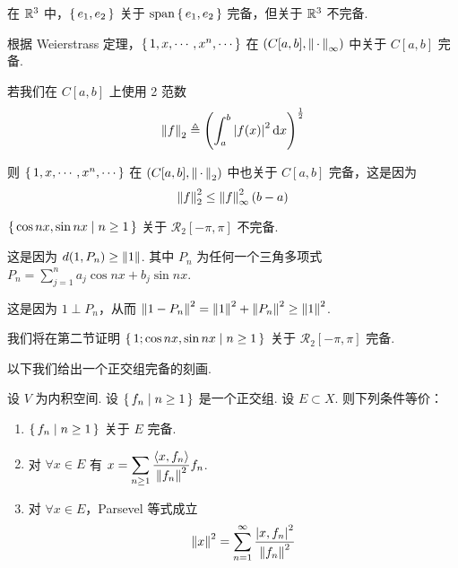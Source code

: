 \begin{example}
    在 $\mathbb{R}^3$ 中，$\set{e_1,e_2}$ 关于 $\mathrm{span}\set{e_1,e_2}$ 完备，但关于 $\mathbb{R}^3$ 不完备.
\end{example}

\begin{example}
    根据 Weierstrass 定理，$\set{1,x,\cdots,x^n,\cdots}$ 在 $(C[a,b],\left\lVert{\,\cdot\,}\right\rVert_\infty)$ 中关于 $C[a,b]$ 完备.
\end{example}

\begin{hint}
    若我们在 $C[a,b]$ 上使用 2 范数
$$
\left\lVert{f}\right\rVert_2\triangleq\left(\int_a^b\left\lvert{f(x)}\right\rvert^2\mathrm{d} x\right)^\frac{1}{2}
$$

    则 $\set{1,x,\cdots,x^n,\cdots}$ 在 $(C[a,b],\left\lVert{\,\cdot\,}\right\rVert_2)$ 中也关于 $C[a,b]$ 完备，这是因为
$$
\left\lVert{f}\right\rVert_2^2\le\left\lVert{f}\right\rVert_\infty^2(b-a)
$$
\end{hint}

\begin{example}
    $\set{\cos nx,\sin nx|n\ge 1}$ 关于 $\mathcal{R}_2[-\pi,\pi]$ 不完备.

    这是因为 $d(1,P_n)\ge\left\lVert{1}\right\rVert$. 其中 $P_n$ 为任何一个三角多项式 $P_n=\sum\limits_{j=1}^na_j\cos nx+b_j\sin nx$.

    这是因为 $1\perp P_n$，从而 $\left\lVert{1-P_n}\right\rVert^2=\left\lVert{1}\right\rVert^2+\left\lVert{P_n}\right\rVert^2\ge\left\lVert{1}\right\rVert^2$.
\end{example}

\begin{hint}
    我们将在第二节证明 $\set{1;\cos nx,\sin nx|n\ge 1}$ 关于 $\mathcal{R}_2[-\pi,\pi]$ 完备.
\end{hint}

以下我们给出一个正交组完备的刻画.

\begin{theorem}
    设 $V$ 为内积空间. 设 $\set{f_n|n\ge 1}$ 是一个正交组. 设 $E\subset X$. 则下列条件等价：

    \begin{enumerate}
        \item\label{1811a} $\set{f_n|n\ge 1}$ 关于 $E$ 完备.
        
        \item\label{1811b} 对 $\forall x\in E$ 有 $x=\displaystyle\sum_{n\ge 1}\frac{\left\langle{x,f_n}\right\rangle}{\left\lVert{f_n}\right\rVert^2}f_n$.
        
        \item\label{1811c} 对 $\forall x\in E$，Parsevel 等式成立
$$
\left\lVert{x}\right\rVert^2=\sum_{n=1}^\infty\frac{\left\lvert{x,f_n}\right\rvert^2}{\left\lVert{f_n}\right\rVert^2}
$$
    \end{enumerate}
\end{theorem}

